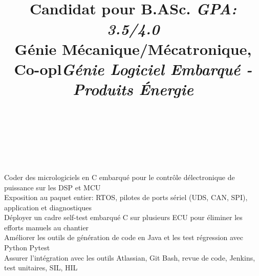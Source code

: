 \documentclass[mm]{res}
\begin{document}
\begin{resume}
\title{Candidat pour B.ASc. \textsl{GPA: 3.5/4.0}\\
G\'enie M\'ecanique/M\'ecatronique, Co-op}
\begin{position}
\end{position}


\toprule

\section{\headingexperience}
\begin{format}
\\
\title{l}\\
\body\\
\end{format}

\title{\textsl{G\'enie Logiciel Embarqu\'e - Produits \'Energie}}
\begin{position}
\tb Coder des micrologiciels en C embarqu\'e pour le contr\^ole d\textquotesingle \'electronique de puissance sur les DSP et MCU\\
\tb Exposition au paquet entier: RTOS, pilotes de ports s\'eriel (UDS, CAN, SPI), application et diagnostiques\\
\tb D\'eployer un cadre self-test embarqu\'e C sur plusieurs ECU pour \'eliminer les efforts manuels au chantier\\
\tb Am\'eliorer les outils de g\'en\'eration de code en Java et les test r\'egression avec Python Pytest\\
\tb Assurer l'int\'egration avec les outils Atlassian, Git Bash, revue de code, Jenkins, test unitaires, SIL, HIL
\end{position}


\end{resume}
\end{document}

